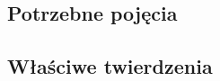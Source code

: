 \subsection{Potrzebne pojęcia}
\label{mfi:knaster_tarski_and_banach:basics}


\subsection{Właściwe twierdzenia}


